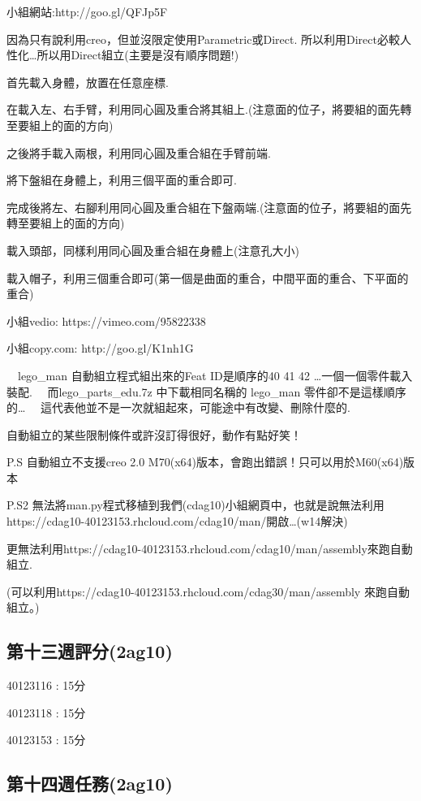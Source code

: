 \documentclass[]{article}
\begin{document}
小組網站:http://goo.gl/QFJp5F

因為只有說利用creo，但並沒限定使用Parametric或Direct.
所以利用Direct必較人性化\ldots{}所以用Direct組立(主要是沒有順序問題!)

首先載入身體，放置在任意座標.

在載入左、右手臂，利用同心圓及重合將其組上.(注意面的位子，將要組的面先轉至要組上的面的方向)

之後將手載入兩根，利用同心圓及重合組在手臂前端.

將下盤組在身體上，利用三個平面的重合即可.

完成後將左、右腳利用同心圓及重合組在下盤兩端.(注意面的位子，將要組的面先轉至要組上的面的方向)

載入頭部，同樣利用同心圓及重合組在身體上(注意孔大小)

載入帽子，利用三個重合即可(第一個是曲面的重合，中間平面的重合、下平面的重合)

小組vedio: https://vimeo.com/95822338

小組copy.com: http://goo.gl/K1nh1G

　lego\_man 自動組立程式組出來的Feat ID是順序的40 41 42
\ldots{}一個一個零件載入裝配. 　而lego\_parts\_edu.7z 中下載相同名稱的
lego\_man 零件卻不是這樣順序的\ldots{}
　這代表他並不是一次就組起來，可能途中有改變、刪除什麼的.

自動組立的某些限制條件或許沒訂得很好，動作有點好笑！

P.S 自動組立不支援creo 2.0
M70(x64)版本，會跑出錯誤！只可以用於M60(x64)版本

P.S2 無法將man.py程式移植到我們(cdag10)小組網頁中，也就是說無法利用
https://cdag10-40123153.rhcloud.com/cdag10/man/開啟\ldots{}(w14解決)

更無法利用https://cdag10-40123153.rhcloud.com/cdag10/man/assembly來跑自動組立.

(可以利用https://cdag10-40123153.rhcloud.com/cdag30/man/assembly
來跑自動組立。)

\subsection{第十三週評分(2ag10)}\label{ux7b2cux5341ux4e09ux9031ux8a55ux52062ag10}

40123116 : 15分

40123118 : 15分

40123153 : 15分

\subsection{第十四週任務(2ag10)}\label{ux7b2cux5341ux56dbux9031ux4efbux52d92ag10}
\end{document}
